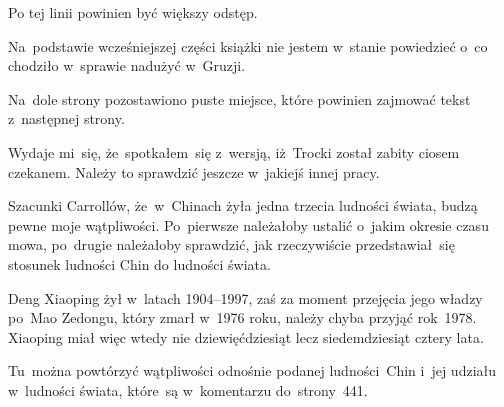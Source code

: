 \documentclass[a4paper,11pt]{article}
\begin{document}
\vspace{\spaceFour}





\noindent
{} Po tej linii powinien być większy odstęp.

\vspace{\spaceFour}





\noindent
{} Na~podstawie wcześniejszej części książki nie jestem
w~stanie powiedzieć o~co chodziło w~sprawie nadużyć w~Gruzji.

\vspace{\spaceFour}





\noindent
{} Na~dole strony pozostawiono puste miejsce, które powinien
zajmować tekst z~następnej strony.

\vspace{\spaceFour}





\noindent
{} Wydaje mi~się, że~spotkałem~się z~wersją, iż~Trocki został
zabity ciosem czekanem. Należy to sprawdzić jeszcze w~jakiejś innej pracy.

\vspace{\spaceFour}





\noindent
{} Szacunki Carrollów, że~w~Chinach żyła jedna trzecia
ludności świata, budzą pewne moje wątpliwości. Po~pierwsze należałoby
ustalić o~jakim okresie czasu mowa, po~drugie należałoby sprawdzić, jak
rzeczywiście przedstawiał~się stosunek ludności Chin do ludności świata.

\vspace{\spaceFour}





\noindent
{} Deng Xiaoping żył w~latach 1904--1997, zaś za moment
przejęcia jego władzy po~Mao Zedongu, który zmarł w~1976 roku, należy
chyba przyjąć rok~1978. Xiaoping miał więc wtedy nie dziewięćdziesiąt lecz
siedemdziesiąt cztery lata.

\vspace{\spaceFour}





\noindent
{} Tu~można powtórzyć wątpliwości odnośnie podanej
ludności~Chin i~jej udziału w~ludności świata, które~są w~komentarzu
do~strony~441.
\end{document}
